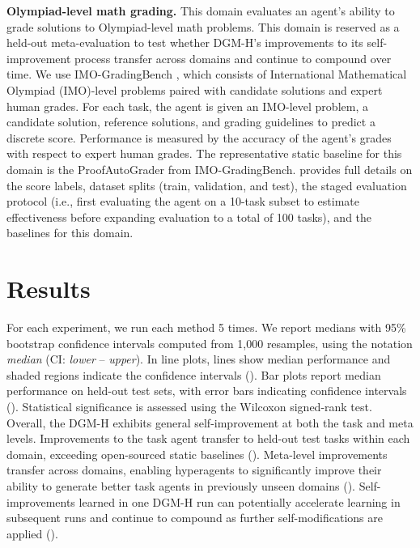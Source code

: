 \documentclass[]{fairmeta}
\begin{document}
\textbf{Olympiad-level math grading.}
This domain evaluates an agent's ability to grade solutions to Olympiad-level math problems. This domain is reserved as a held-out meta-evaluation to test whether DGM-H's improvements to its self-improvement process transfer across domains and continue to compound over time. We use IMO-GradingBench \citep{luong2025towards}, which consists of International Mathematical Olympiad (IMO)-level problems paired with candidate solutions and expert human grades. For each task, the agent is given an IMO-level problem, a candidate solution, reference solutions, and grading guidelines to predict a discrete score. Performance is measured by the accuracy of the agent's grades with respect to expert human grades. The representative static baseline for this domain is the ProofAutoGrader from IMO-GradingBench.  provides full details on the score labels, dataset splits (train, validation, and test), the staged evaluation protocol (i.e., first evaluating the agent on a 10-task subset to estimate effectiveness before expanding evaluation to a total of 100 tasks), and the baselines for this domain.

\section{Results}
\label{sec:results}

For each experiment, we run each method 5 times. We report medians with 95\% bootstrap confidence intervals computed from 1,000 resamples, using the notation \textit{median} (CI: \textit{lower} -- \textit{upper}). In line plots, lines show median performance and shaded regions indicate the confidence intervals (). Bar plots report median performance on held-out test sets, with error bars indicating confidence intervals (). Statistical significance is assessed using the Wilcoxon signed-rank test. Overall, the DGM-H exhibits general self-improvement at both the task and meta levels. Improvements to the task agent transfer to held-out test tasks within each domain, exceeding open-sourced static baselines (). Meta-level improvements transfer across domains, enabling hyperagents to significantly improve their ability to generate better task agents in previously unseen domains (). Self-improvements learned in one DGM-H run can potentially accelerate learning in subsequent runs and continue to compound as further self-modifications are applied ().
\end{document}
